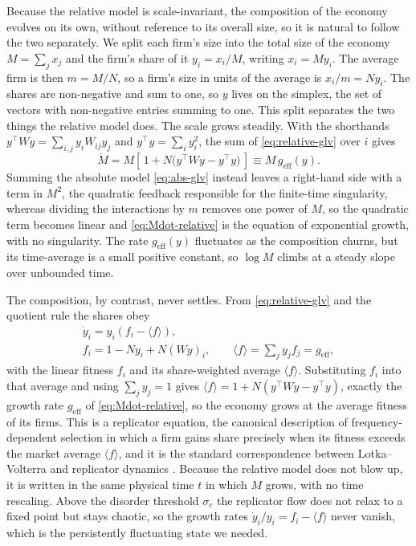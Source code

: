 Because the relative model is scale-invariant, the composition of the economy evolves on its own,
without reference to its overall size, so it is natural to follow the two separately. We split
each firm's size into the total size of the economy $M = \sum_j x_j$ and the firm's share of it
$y_i = x_i/M$, writing $x_i = M y_i$. The average firm is then $m = M/N$, so a firm's size in units
of the average is $x_i/m = N y_i$. The shares are non-negative and sum to one, so $y$ lives on
the simplex, the set of vectors with non-negative entries summing to one. This split separates the
two things the relative model does. The scale grows steadily. With the shorthands
$y^{\!\top} W y = \sum_{i,j} y_i W_{ij} y_j$ and $y^{\!\top} y = \sum_i y_i^2$, the sum of
\eqref{eq:relative-glv} over $i$ gives
\begin{equation}
    \dot{M} = M \left[\, 1 + N\big( y^{\!\top} W y - y^{\!\top} y \big)\,\right]
            \equiv M\, g_{\mathrm{eff}}(y).
    \label{eq:Mdot-relative}
\end{equation}
Summing the absolute model \eqref{eq:abs-glv} instead leaves a right-hand side with a term in
$M^2$, the quadratic feedback responsible for the finite-time singularity, whereas dividing the
interactions by $m$ removes one power of $M$, so the quadratic term becomes linear and
\eqref{eq:Mdot-relative} is the equation of exponential growth, with no singularity. The rate
$g_{\mathrm{eff}}(y)$ fluctuates as the composition churns, but its time-average is a small
positive constant, so $\log M$ climbs at a steady slope over unbounded time.

The composition, by contrast, never settles. From \eqref{eq:relative-glv} and the quotient rule
the shares obey
\begin{equation}
    \begin{gathered}
        \dot{y}_i = y_i \left( f_i - \langle f \rangle \right), \\
        f_i = 1 - N y_i + N (Wy)_i,
        \qquad \langle f \rangle = \sum_j y_j f_j = g_{\mathrm{eff}},
    \end{gathered}
    \label{eq:replicator-shape}
\end{equation}
with the linear fitness $f_i$ and its share-weighted average $\langle f \rangle$. Substituting
$f_i$ into that average and using $\sum_j y_j = 1$ gives
$\langle f \rangle = 1 + N( y^{\!\top} W y - y^{\!\top} y )$, exactly the growth rate
$g_{\mathrm{eff}}$ of \eqref{eq:Mdot-relative}, so the economy grows at the average fitness of its
firms. This is a
replicator equation, the canonical description of frequency-dependent selection in which a firm
gains share precisely when its fitness exceeds the market average $\langle f \rangle$, and it is
the standard correspondence between Lotka--Volterra and replicator dynamics \citep{hofbauer81}.
Because the relative model does not blow up, it is written in the same physical time $t$ in which
$M$ grows, with no time rescaling. Above the disorder threshold $\sigma_c$
\citep{diederich1989,opperdiederich1992} the replicator flow does not relax to a fixed point but stays chaotic, so
the growth rates $\dot y_i / y_i = f_i - \langle f\rangle$ never vanish, which is the persistently
fluctuating state we needed.

